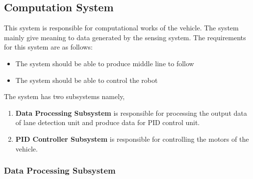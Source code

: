 \documentclass[a4paper,12pt]{article}
\begin{document}


\subsection{Computation System}



This system is responsible for computational works of the vehicle. The system mainly give meaning to data generated by the sensing system. The requirements for this system are as follows: 


\begin{itemize}

\item The system should	be able to produce middle line to follow

\item The system should be able to control the robot

\end{itemize}	


\noindent The system has two subsystems namely,


\begin{enumerate}

\item \textbf{Data Processing Subsystem} is responsible for processing the output data of lane detection unit and produce data for PID control unit.

\item \textbf{PID Controller Subsystem} is responsible for controlling the motors of the vehicle.

\end{enumerate}




\subsubsection{Data Processing Subsystem}\label{sect:dataProcessingSubsystem}
\end{document}
